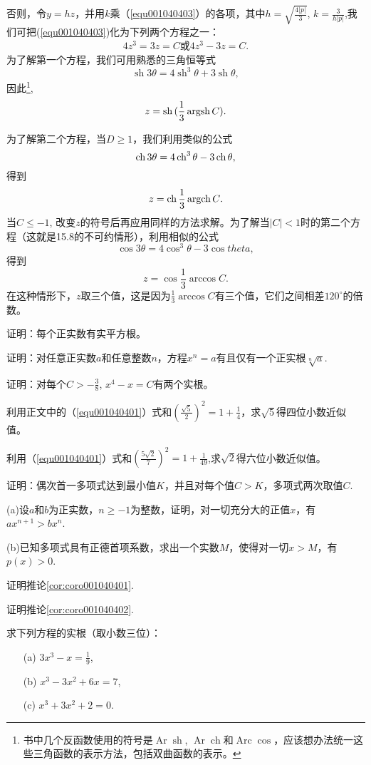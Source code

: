 否则，令$y=hz$，并用$k$乘（\ref{equ001040403}）的各项，其中$h=\sqrt{\frac{4|p|}{3}}$, $k=\frac{3}{h|p|}$,我们可把(\ref{equ001040403})化为下列两个方程之一：
\begin{gather}\label{equ001040408}
4z^3=3z=C\text{或}4z^3-3z=C.
\end{gather}
为了解第一个方程，我们可用熟悉的三角恒等式
\[
\operatorname{sh}{3\theta} = 4\operatorname{sh}^3{\theta} + 3\operatorname{sh}{\theta},
\]
因此\footnote{书中几个反函数使用的符号是$\operatorname{Ar}\operatorname{sh}$, $\operatorname{Ar}\operatorname{ch}$和$\operatorname{Arc}\operatorname{cos}$，应该想办法统一这些三角函数的表示方法，包括双曲函数的表示。},
\[
z = \operatorname{sh}{(\frac{1}{3}\operatorname{argsh}{C})}.
\]

为了解第二个方程，当$D \ge 1$，我们利用类似的公式
\[
\operatorname{ch}{3\theta} = 4\operatorname{ch}^3{\theta} -3\operatorname{ch}{\theta},
\]
得到
\[
z = \operatorname{ch}{\frac{1}{3}\operatorname{argch}{C}}.
\]
当$C \le -1$, 改变$z$的符号后再应用同样的方法求解。为了解当$|C|<1$时的第二个方程（这就是15.8的不可约情形），利用相似的公式
\[
\cos{3\theta} = 4\cos^3{\theta}-3\cos{theta},
\]
得到
\[
z = \cos{\frac{1}{3}\arccos{C}}.
\]
在这种情形下，$z$取三个值，这是因为$\frac{1}{3}\arccos{C}$有三个值，它们之间相差$120^\circ$的倍数。

\begin{problemset}
\item 证明：每个正实数有实平方根。

\item 证明：对任意正实数$a$和任意整数$n$，方程$x^n=a$有且仅有一个正实根$\sqrt[n]{a}$.

\item 证明：对每个$C > -\frac{3}{8}$, $x^4-x=C$有两个实根。

\item 利用正文中的（\ref{equ001040401}）式和$(\frac{\sqrt{5}}{2})^2 = 1 + \frac{1}{4}$，求$\sqrt{5}$得四位小数近似值。

\item 利用（\ref{equ001040401}）式和$(\frac{5\sqrt{2}}{7})^2 = 1 + \frac{1}{49}$,求$\sqrt{2}$得六位小数近似值。

\item 证明：偶次首一多项式达到最小值$K$，并且对每个值$C>K$，多项式两次取值$C$.

\item (a)设$a$和$b$为正实数，$n \ge -1$为整数，证明，对一切充分大的正值$x$，有$ax^{n+1} > bx^n$.

(b)已知多项式具有正德首项系数，求出一个实数$M$，使得对一切$x > M$，有$p(x)>0$.

\item 证明推论\ref{cor:coro001040401}.

\item 证明推论\ref{cor:coro001040402}.

\item 求下列方程的实根（取小数三位）：
\begin{enumerate}
\item[(a)]$3x^3 - x = \frac{1}{9}$,
\item[(b)]$x^3 - 3x^2 + 6x = 7$,
\item[(c)]$x^3+3x^2+2=0$.
\end{enumerate}
\end{problemset}


